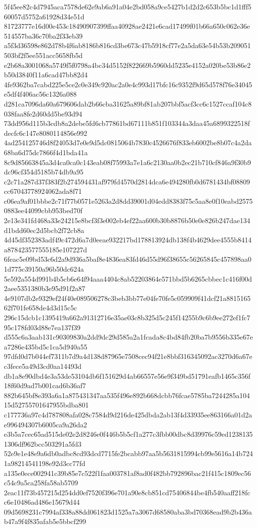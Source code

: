 {5f45ee82c4d7945aca7578de62e9ab6a91a04e2bd058a9ce5427b1d2d2c653b5bc1d1fff560057d5752a61928d34e51d
81723777e16d00e453c18490907399ffaa40928ae2421e6cad17499f01b66a650c062e36e514557ba36c70ba2f33eb39
a5f3d36598e862d78b4f6ab8186b816cd3be673c47b5918cf77e2a5da63e54b53b209051503bf2f5ee551acc5658fb5d
e2b68a3001068a5749f5f0798a4bc34d5152f822669b5960dd5235e4152a020be53b86e2b50d3840f11a6cad47bb82d4
4fe9362ba7cabd225e5ce2c0e349c920ac2a0e4c993d17bfc16c9352f9d65d578f76e34045e5df4f406ac56c1326a088
d281ca7096da60a679606dab2b66cba31625a89bf81ab207bbf5acf3cc6c1527ccaf104c8038faa8fe2d60dd5be93d94
73dd956d115b3cdb8a2debe5fd6cb77861bd67111b851f103344a3daa45a6899322518fdecfc6c147e8080114856e992
4ad254125746d8f24053d7e0e9d5dc0815064b7830c4526676f833eb6002be8b07c4a2da68ba6d75dc7866f4d1bda41a
8c9d85663845a3d4ca0ca0c143eab08f75993a7e1a6c2130aa0b2ec21b710cf846a9f30b9dc96cf354d5185b74db9a95
c2c71a287d37f383f2b274594431af979fd4570d2814dca6e494280fb0d6781434bf08809cc67043778924062ada8f71
c06ea9af01bbbe2c71f77b0571e5263a2d8dd39001d04edd8383f75c5aa8e0f10eabd25750883ee44099cbb953bed70f
2e13e341fd468a33e24215e8bcf3f3e002eb4ef22aa600b30b8876b50e0e826b247dae134d1bdd60ec2d5bcb2f72cb8a
4d45df352383adf49c472d6a7d0eeae932217bd178813924db138f4b4629dee4555b8414a878423577555185e107227d
6feac5e09bd53c6d2a9d936a5baf8e4836ea83fd46d55d96f38655c56265845c457898aa01d775c39150a96b50dc624a
5e592a554d991b4b5cb6e64f94aaa4404c8ab52203864e571bbd5b6265cbbec1c416f00d2aee5351380b3e95d91f2a87
4e9107db2e9329ef24f40e089506278c3beb3bb77e04fe70fe5c059909f41dcf21a881516562f701fe658de4d3d15c5c
296c15dcb1c1395419a662a91312716e35ae03c8b325d5c245f14255b9c6b9ee272ef1fc795c178fd03d88e7ea137f39
d555c6a3aab131c90309830a2dd9dc29d585a2a1fcada8c4bd84fb20ba7b9556b335e67ea7286e435bd5c1ca5d940a55
97dfd0d7b044ef7311b7d9a4d138d87965e7508cec94f21e8bbf316345092ac3270d6a67ec3fece5a49d3cd0aa14493d
db1a8e90dbd4e3a53de53104db6f151629d4ab66557e56e9f349bd51791eafb1465c356f18f60d9ad7b001cad6b36af7
882b645bf8e393a6a1a875431347aa535f496e892b668dcbb76fcae5785ba7244285a10415d52755701647955bdba801
c177736a97c4d787808afa028c7584d9d216de425dbda2ab13f4d33935ee863166a01d2ae996494307b6005ca9a26da2
e3b5a7cec65ad515de02e2d8246e0f446b5b5cf1a277c3fbb00dbc8d39976c59ed12381351306df962bcc503291a5fd3
52e9e1e48e9a6db0adbc8cd93dcd7715fe2bcabb97aa5b5631815994cb99e5616a14b7241a98214541198e92d3cc77fd
a135e0ece002941c39b85e7c522f1faa003781af8ad0f482bb792896bac21f415c1809ec56c54c9a5ca258fa58ab5709
2eac11f73b457215d254dd0ef7520f396e701a90e8cb851cd75406844be4fb540aaff218fcc6e10486ad486e15679d44
09d5698231c7994af338a88dd061823d1525a7a3067d68580aba3bd70368ead9b2b436ab47a9f4f835afab5e5bbcf299
}
